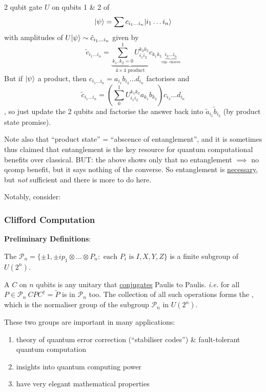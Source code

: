 \documentclass[]{article}
\renewcommand{\it}[1]{\textit{#1}}
\begin{document}
\begin{remark*}[Example]
	2 qubit gate $U$ on qubits 1 \& 2 of $$\lvert\psi\rangle = \sum c_{i_1\dots i_n}\lvert i_1\dots i_n\rangle$$ with amplitudes of $U\lvert\psi\rangle\sim \tilde{c}_{i_1\dots i_n}$ given by $$\tilde{c}_{i_1\dots i_n} = \underbrace{\sum_{k_1,k_2=0}^{1} U_{i_1i_2}^{k_2 k_2}}_{\textrm{$4\times4$ product}}c_{k_1k_2\underbrace{i_3\dots i_n}_{\textrm{exp. choices}}}$$
	But if $\lvert\psi\rangle$ a product, then $c_{i_1\dots i_n} = a_{i_1}b_{i_2}\dots d_{i_n}$ factorises and $$\tilde{c}_{i_1\dots i_n} = \left(\sum_{0}^{1}U^{k_1k_2}_{i_1i_2}a_{k_1}b_{k_2}\right)c_{i_3}\dots d_{i_n}$$, so just update the 2 qubits and factorise the answer back into $\tilde{a}_{i_1}\tilde{b}_{i_2}$ (by product state promise).
\end{remark*}

Note also that ``product state'' = ``abscence of entanglement'', and it is sometimes thus claimed that entanglement is the key resource for quantum computational benefits over classical. BUT: the above shows only that no entanglement $\implies$ no qcomp benefit, but it says nothing of the converse. So entanglement is \underline{necessary}, but \it{not} sufficient and there is more to do here.

Notably, consider:

\subsubsection*{Clifford Computation}

\textbf{Preliminary Definitions}:

The  $\mathcal{P}_n = \{\pm1,\pm i p_1\otimes\dots \otimes P_n : \textrm{ each }P_i\textrm{ is }I,X,Y,Z\}$ is a finite subgroup of $U(2^n)$.

A  $C$ on $n$ qubits is any unitary that \underline{conjugates} Paulis to Paulis. \it{i.e.} for all $P \in \mathcal{P}_n\ CPC^\dagger = \tilde{P}$ is in $\mathcal{P}_n$ too. The collection of all such operations forms the , which is the normaliser group of the subgroup $\mathcal{P}_n$ in $U(2^n)$.

These two groups are important in many applications:
\begin{enumerate}[label = \arabic*)]
	\item theory of quantum error correction (``stabiliser codes'') \& fault-tolerant quantum computation
	\item insights into quantum computing power
	\item have very elegant mathematical properties
\end{enumerate}
\end{document}
